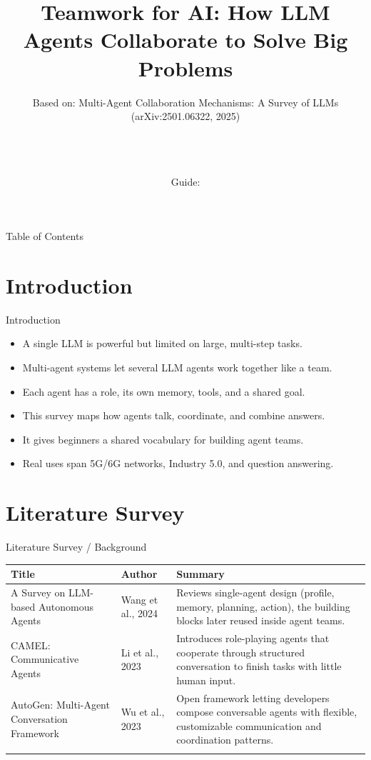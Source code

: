 \documentclass[10pt]{beamer}
\title[B.Tech Seminar]{Teamwork for AI: How LLM Agents Collaborate to Solve Big Problems}
\subtitle{Based on: Multi-Agent Collaboration Mechanisms: A Survey of LLMs (arXiv:2501.06322, 2025)}
\author[\studentname\ (\shortinst)]{\studentname \\ \small \rollno \\ \small \rollclass \\ \small Guide: \guidename}
\institute[]{\deptname \\ \collegename}
\date{\seminardate}
\begin{document}
\begin{frame}[plain]
  \titlepage
\end{frame}
\begin{frame}{Table of Contents}
  \tableofcontents
\end{frame}
\section{Introduction}
\begin{frame}{Introduction}
\begin{itemize}
  \item A single LLM is powerful but limited on large, multi-step tasks.
  \item Multi-agent systems let several LLM agents work together like a team.
  \item Each agent has a role, its own memory, tools, and a shared goal.
  \item This survey maps how agents talk, coordinate, and combine answers.
  \item It gives beginners a shared vocabulary for building agent teams.
  \item Real uses span 5G/6G networks, Industry 5.0, and question answering.
\end{itemize}
\end{frame}
\section{Literature Survey}
\begin{frame}{Literature Survey / Background}
  \small
  \begin{tabular}{@{}p{2.7cm}p{2.3cm}p{5.6cm}@{}}
    \toprule
    \textbf{Title} & \textbf{Author} & \textbf{Summary} \\
    \midrule
    A Survey on LLM-based Autonomous Agents & Wang et al., 2024 & Reviews single-agent design (profile, memory, planning, action), the building blocks later reused inside agent teams. \\
    \addlinespace
    CAMEL: Communicative Agents & Li et al., 2023 & Introduces role-playing agents that cooperate through structured conversation to finish tasks with little human input. \\
    \addlinespace
    AutoGen: Multi-Agent Conversation Framework & Wu et al., 2023 & Open framework letting developers compose conversable agents with flexible, customizable communication and coordination patterns. \\
    \addlinespace
    \bottomrule
  \end{tabular}
\end{frame}
\end{document}
